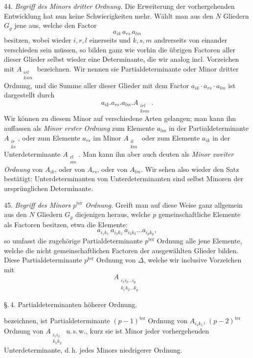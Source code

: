\documentclass[11pt]{article}
\providecommand{\weberpage}[1]{}
\begin{document}
44. \textit{Begriff des Minors dritter Ordnung.} Die Erweiterung der vorhergehenden Entwicklung hat nun keine Schwierigkeiten mehr. Wählt man aus den $N$ Gliedern $G_\varrho$ jene aus, welche den Factor
\[
a_{ik}\, a_{rs}\, a_{lm}
\]
besitzen, wobei wieder $i, r, l$ einerseits und $k, s, m$ andrerseits von einander verschieden sein müssen, so bilden ganz wie vorhin die übrigen Factoren aller dieser Glieder selbst wieder eine Determinante, die wir analog incl. Vorzeichen mit $A_{\substack{irl\\ksm}}$ bezeichnen. Wir nennen sie Partialdeterminante oder Minor dritter Ordnung, und die Summe aller dieser Glieder mit dem Factor $a_{ik} \cdot a_{rs} \cdot a_{lm}$ ist dargestellt durch
\[
a_{ik} . a_{rs} . a_{lm} . A_{\substack{irl\\ksm}}.
\]
Wir können zu diesem Minor auf verschiedene Arten gelangen; man kann ihn auffassen als \textit{Minor erster Ordnung} zum Elemente $a_{lm}$ in der Partialdeterminante $A_{\substack{ir\\ks}}$, oder zum Elemente $a_{rs}$ im Minor $A_{\substack{il\\km}}$ oder zum Elemente $a_{ik}$ in der Unterdeterminante $A_{\substack{rl\\sm}}$. Man kann ihn aber auch deuten als \textit{Minor zweiter Ordnung} von $A_{ik}$, oder von $A_{rs}$, oder von $A_{lm}$. Wir sehen also wieder den Satz bestätigt: Unterdeterminanten von Unterdeterminanten sind selbst Minoren der ursprünglichen Determinante.

45. \textit{Begriff des Minors $p^{\text{ter}}$ Ordnung.} Greift man auf diese Weise ganz allgemein aus den $N$ Gliedern $G_\varrho$ diejenigen heraus, welche $p$ gemeinschaftliche Elemente als Factoren besitzen, etwa die Elemente:
\[
a_{i_1k_1}\ a_{i_2k_2}\ a_{i_3k_3} \ldots a_{i_pk_p},
\]
so umfasst die zugehörige Partialdeterminante $p^{\text{ter}}$ Ordnung alle jene Elemente, welche die nicht gemeinschaftlichen Factoren der ausgewählten Glieder bilden. Diese Partialdeterminante $p^{\text{ter}}$ Ordnung von $\varDelta$, welche wir inclusive Vorzeichen mit
\[
A_{\substack{i_1 i_2 \ldots i_p\\ k_1 k_2 \ldots k_p}}
\]


\weberpage{51}
\S.\,4. Partialdeterminanten höherer Ordnung.

bezeichnen, ist Partialdeterminante $(p-1)^{\text{ter}}$ Ordnung von $A_{i_1k_1}$, $(p-2)^{\text{ter}}$ Ordnung von $A_{\substack{i_1 i_2\\k_1 k_2}}$ u.\,s.\,w., kurz sie ist Minor jeder vorhergehenden Unterdeterminante, d.\,h. jedes Minors niedrigerer Ordnung.
\end{document}
